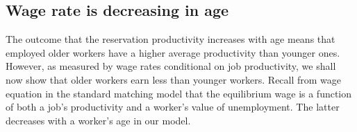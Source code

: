 

\subsection{Wage rate is decreasing in age}\label{Sec_M_OLG_wage}%
The outcome that the reservation productivity increases with age means that
employed older workers have a higher average productivity than younger
ones. However, as measured by wage rates conditional on job productivity, we shall
now show that
 older workers earn less than younger workers. Recall
from wage equation  in the standard matching model that the
equilibrium wage is a function of both a job's productivity and
a worker's value of unemployment. The latter decreases
with a worker's  age in our model.


